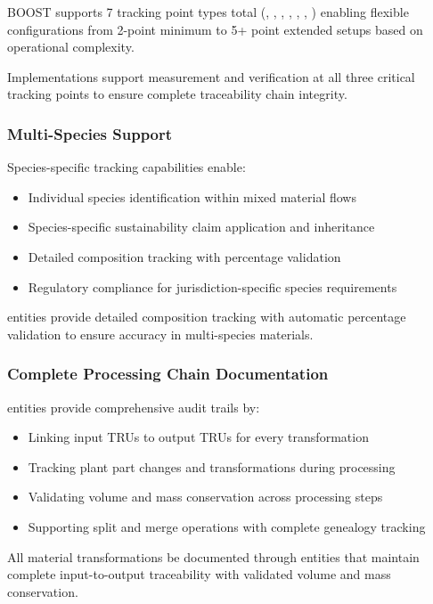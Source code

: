 BOOST supports 7 tracking point types total (, , , , , , ) enabling flexible configurations from 2-point minimum to 5+ point extended setups based on operational complexity.

\begin{normative}[title=Critical Tracking Point Requirements]
Implementations \MUST{} support measurement and verification at all three critical tracking points to ensure complete traceability chain integrity.
\end{normative}

\subsubsection{Multi-Species Support}
\label{sec:multi-species-support}

Species-specific tracking capabilities enable:

\begin{itemize}
    \item Individual species identification within mixed material flows
    \item Species-specific sustainability claim application and inheritance
    \item Detailed composition tracking with percentage validation
    \item Regulatory compliance for jurisdiction-specific species requirements
\end{itemize}

\begin{informative}[title=Species Composition Validation]
 entities provide detailed composition tracking with automatic percentage validation to ensure accuracy in multi-species materials.
\end{informative}

\subsubsection{Complete Processing Chain Documentation}
\label{sec:processing-chain-documentation}

 entities provide comprehensive audit trails by:

\begin{itemize}
    \item Linking input TRUs to output TRUs for every transformation
    \item Tracking plant part changes and transformations during processing
    \item Validating volume and mass conservation across processing steps
    \item Supporting split and merge operations with complete genealogy tracking
\end{itemize}

\begin{normative}[title=Processing Chain Requirements]
All material transformations \MUST{} be documented through  entities that maintain complete input-to-output traceability with validated volume and mass conservation.
\end{normative}